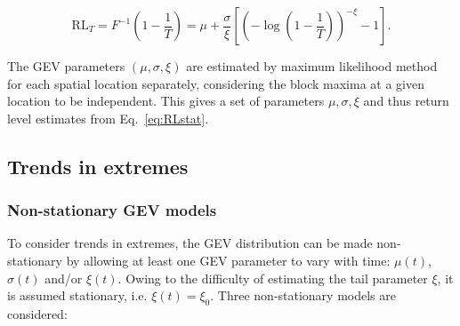\documentclass[french,a4paper,DIV=11,numbers=noendperiod]{scrartcl}
\begin{document}
\begin{equation}\label{eq:RLstat}
\mathrm{RL}_{T}
= F^{-1}\!\left(1 - \frac{1}{T}\right)
= \mu + \frac{\sigma}{\xi}
\left[
\left(
-\log\!\left(1 - \frac{1}{T}\right)
\right)^{-\xi}
- 1
\right].
\end{equation}


The GEV parameters $(\mu,\sigma,\xi)$ are estimated by maximum likelihood method for each
spatial location separately, considering the block maxima at a given
location to be independent. This gives a set of parameters $\mu,\sigma,\xi$ and thus
return level estimates from Eq.~\ref{eq:RLstat}.

\subsection{Trends in extremes}\label{trends-in-extremes}

\subsubsection{Non-stationary GEV models}\label{non-stationary-gev}

To consider trends in extremes, the GEV distribution can be made non-stationary
by allowing at least one GEV parameter to vary with time: $\mu(t)$, $\sigma(t)$
and/or $\xi(t)$. Owing to the difficulty of estimating the tail parameter $\xi$,
it is assumed stationary, i.e. $\xi(t) = \xi_0$. Three non-stationary models are
considered:
\end{document}
